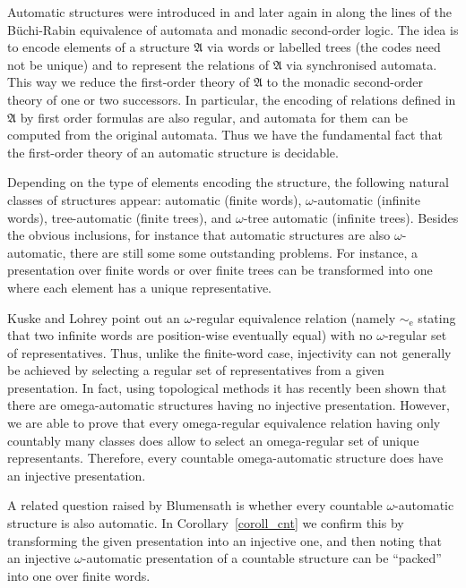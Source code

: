 \documentclass{stacs_proc}
\newcommand{\eqe}{\sim_{\textrm{e}}}
\newcommand{\frakA}{\mathfrak{A}}
\begin{document}
\setlength{\parskip}{0pt}



Automatic structures were introduced in \cite{Hod83} and later again in
\cite{KN95,BG00} along the lines of the B\"uchi-Rabin equivalence of automata and
monadic second-order logic. The idea is to encode elements of a
structure $\frakA$ via words or labelled trees (the codes need not be unique)
and to represent the relations of $\frakA$ via synchronised automata. This way
we reduce the first-order theory of $\frakA$ to the monadic second-order theory
of one or two successors.  In particular, the encoding of relations defined in
$\frakA$ by first order formulas are also regular, and automata for them can be
computed from the original automata. Thus we have the fundamental fact that the
first-order theory of an automatic structure is decidable. 

Depending on the type of elements encoding the structure, the following natural
classes of structures appear: automatic (finite words), $\omega$-automatic
(infinite words), tree-automatic (finite trees), and $\omega$-tree automatic
(infinite trees). Besides the obvious inclusions, for instance that automatic
structures are also $\omega$-automatic, there are still some some outstanding
problems.  For instance, a presentation over finite words or over finite trees 
can be transformed into one where each element has a unique representative. 

Kuske and Lohrey \cite{KL06} point out an $\omega$-regular
equivalence relation (namely $\eqe$ stating that two infinite words are
position-wise eventually equal) with no $\omega$-regular set of representatives.
Thus, unlike the finite-word case, injectivity can not generally be achieved by
selecting a regular set of representatives from a given presentation. 
In fact, using topological methods it has recently been shown \cite{HKMNman} 
that there are omega-automatic structures having no injective presentation.
However, we are able to prove that every omega-regular equivalence relation
having only countably many classes does allow to select an omega-regular
set of unique representants. Therefore, every countable omega-automatic structure 
does have an injective presentation.

A related question raised by Blumensath \cite{Blu99} is whether every countable
$\omega$-automatic structure is also automatic. In Corollary~\ref{coroll_cnt} 
we confirm this by transforming the given presentation into an injective one, 
and then noting that an injective $\omega$-automatic presentation of a countable 
structure can be ``packed'' into one over finite words.
\end{document}
